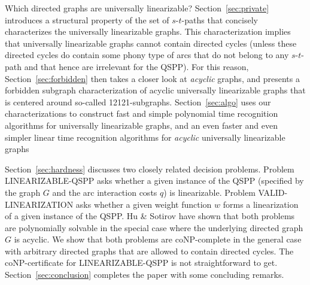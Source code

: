 \documentclass[11pt,fleqn]{article}
\begin{document}
Which directed graphs are universally linearizable?
Section~\ref{sec:private} introduces a structural property of the set of $s$-$t$-paths that
concisely characterizes the universally linearizable graphs.
This characterization implies that universally linearizable graphs cannot contain directed cycles
(unless these directed cycles do contain some phony type of arcs that do not belong to 
any $s$-$t$-path and that hence are irrelevant for the QSPP).
For this reason, Section~\ref{sec:forbidden} then takes a closer look at \emph{acyclic} graphs, 
and presents a forbidden subgraph characterization of acyclic universally linearizable graphs 
that is centered around so-called 12121-subgraphs.
Section~\ref{sec:algo} uses our characterizations to construct fast and simple polynomial time 
recognition algorithms for universally linearizable graphs, and an even faster and even simpler
linear time recognition algorithms for \emph{acyclic} universally linearizable graphs

Section~\ref{sec:hardness} discusses two closely related decision problems.
Problem LINEARIZABLE-QSPP asks whether a given instance of the QSPP (specified by the 
graph $G$ and the arc interaction costs $q$) is linearizable.
Problem VALID-LINEARIZATION asks whether a given weight function $w$ forms a linearization
of a given instance of the QSPP. 
Hu \& Sotirov \cite{HuSo2018b} have shown that both problems are polynomially solvable 
in the special case where the underlying directed graph $G$ is acyclic.
We show that both problems are coNP-complete in the general case with arbitrary directed 
graphs that are allowed to contain directed cycles.
The coNP-certificate for LINEARIZABLE-QSPP is not straightforward to get.
Section~\ref{sec:conclusion} completes the paper with some concluding remarks.


\medskip
\end{document}
